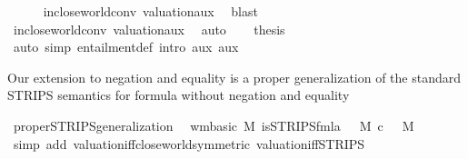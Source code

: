 \begin{isabellebody}
\ \ \ \ \isamarkupfalse%
\ in{\isacharunderscore}{\kern0pt}close{\isacharunderscore}{\kern0pt}world{\isacharunderscore}{\kern0pt}conv\ valuation{\isacharunderscore}{\kern0pt}aux{\isacharunderscore}{\kern0pt}{}\ \isamarkupfalse%
\ blast\isanewline
\ \ \ \ \isamarkupfalse%
\ in{\isacharunderscore}{\kern0pt}close{\isacharunderscore}{\kern0pt}world{\isacharunderscore}{\kern0pt}conv\ valuation{\isacharunderscore}{\kern0pt}aux{\isacharunderscore}{\kern0pt}{}\ \isamarkupfalse%
\ auto\isanewline
\ \ \isamarkupfalse%
\ {\isacharquery}{\kern0pt}thesis\isanewline
\ \ \ \ \isamarkupfalse%
\ {\isacharparenleft}{\kern0pt}auto\ simp{\isacharcolon}{\kern0pt}\ entailment{\isacharunderscore}{\kern0pt}def\ intro{\isacharcolon}{\kern0pt}\ aux{}\ aux{}{\isacharparenright}{\kern0pt}\isanewline
{}\isamarkupfalse%
%
\endisatagproof
{\isafoldproof}%
%
\isadelimproof
%
\endisadelimproof
%
\begin{isamarkuptext}%
Our extension to negation and equality is a proper generalization of the
  standard STRIPS semantics for formula without negation and equality%
\end{isamarkuptext}\isamarkuptrue%
\isamarkupfalse%
\ proper{\isacharunderscore}{\kern0pt}STRIPS{\isacharunderscore}{\kern0pt}generalization{\isacharcolon}{\kern0pt}\isanewline
\ \ {\isachardoublequoteopen}{\isasymlbrakk}wm{\isacharunderscore}{\kern0pt}basic\ M{\isacharsemicolon}{\kern0pt}\ is{\isacharunderscore}{\kern0pt}STRIPS{\isacharunderscore}{\kern0pt}fmla\ {\isasymphi}{\isasymrbrakk}\ {\isasymLongrightarrow}\ M\ \isactrlsup c{\isasymTTurnstile}\isactrlsub {\isacharequal}{\kern0pt}\ {\isasymphi}\ {\isasymlongleftrightarrow}\ M\ {\isasymTTurnstile}\ {\isasymphi}{\isachardoublequoteclose}\isanewline
%
\isadelimproof
\ \ %
\endisadelimproof
%
\isatagproof
{}\isamarkupfalse%
\ {\isacharparenleft}{\kern0pt}simp\ add{\isacharcolon}{\kern0pt}\ valuation{\isacharunderscore}{\kern0pt}iff{\isacharunderscore}{\kern0pt}close{\isacharunderscore}{\kern0pt}world{\isacharbrackleft}{\kern0pt}symmetric{\isacharbrackright}{\kern0pt}\ valuation{\isacharunderscore}{\kern0pt}iff{\isacharunderscore}{\kern0pt}STRIPS{\isacharparenright}{\kern0pt}%
\endisatagproof
{\isafoldproof}%
%
\isadelimproof
%
\endisadelimproof
%
\isadelimdocument
%
\endisadelimdocument
%
\isatagdocument
%
\isamarkuptrue%
%
\endisatagdocument

\end{isabellebody}
